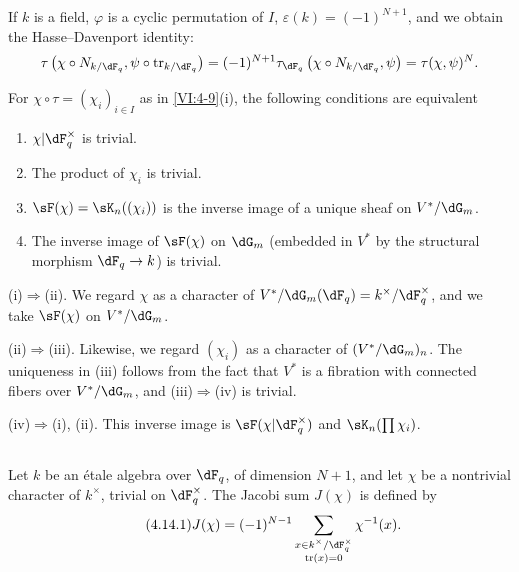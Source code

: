 If $k$ is a field, $\varphi$ is a cyclic permutation of $I$, 
$\varepsilon(k) = (-1)^{N+1}$, and we obtain the Hasse--Davenport identity: 
\[
  \tau\left(\chi\circ N_{k/\dF_q},\psi\circ \tr_{k/\dF_q}\right) = (-1)^{N+1} \tau_{\dF_q}\left(\chi\circ N_{k/\dF_q},\psi\right) = \tau(\chi,\psi)^N \text{.} 
\]





\begin{lemma_}\label{VI:4-13}
For $\chi\circ \tau=(\chi_i)_{i\in I}$ as in \ref{VI:4-9}(i), the
following conditions are equivalent 
\begin{enumerate}[\indent (i)]
  \item $\chi| \dF_q^\times$ is trivial. 
  \item The product of $\chi_i$ is trivial. 
  \item $\sF(\chi) = \sK_n((\chi_i))$ is the inverse image of a unique 
    sheaf on $V^\ast/\dG_m$. 
  \item The inverse image of $\sF(\chi)$ on $\dG_m$ (embedded in 
    $V^\ast$ by the structural morphism $\dF_q \to k$) is trivial. 
\end{enumerate}
\end{lemma_}

(i)$\Rightarrow$(ii). We regard $\chi$ as a character of 
$V^\ast/\dG_m(\dF_q)=k^\times/\dF_q^\times$, and we take $\sF(\chi)$ on 
$V^\ast/\dG_m$. 

(ii)$\Rightarrow$(iii). Likewise, we regard $(\chi_i)$ as a character 
of $(V^\ast/\dG_m)_n$. The uniqueness in (iii) follows from the fact that $V^\ast$ is 
a fibration with connected fibers over $V^\ast/\dG_m$, and (iii)$\Rightarrow$(iv)  
is trivial. 

(iv)$\Rightarrow$(i), (ii). This inverse image is 
$\sF(\chi|\dF_q^\times)$ and $\sK_n(\prod \chi_i)$. 





\subsection{}\label{VI:4-14}

Let $k$ be an étale algebra over $\dF_q$, of 
dimension $N+1$, and let $\chi$ be a nontrivial character of $k^\times$, trivial on 
$\dF_q^\times$. The Jacobi sum $J(\chi)$ is defined by 
\begin{equation*}\tag{4.14.1}\label{VI:eq:4-14-1}
  J(\chi) = (-1)^{N-1} \sum_{\substack{x\in k^\times/\dF_q^\times \\ \tr(x)=0}} \chi^{-1}(x) \text{.} 
\end{equation*}

